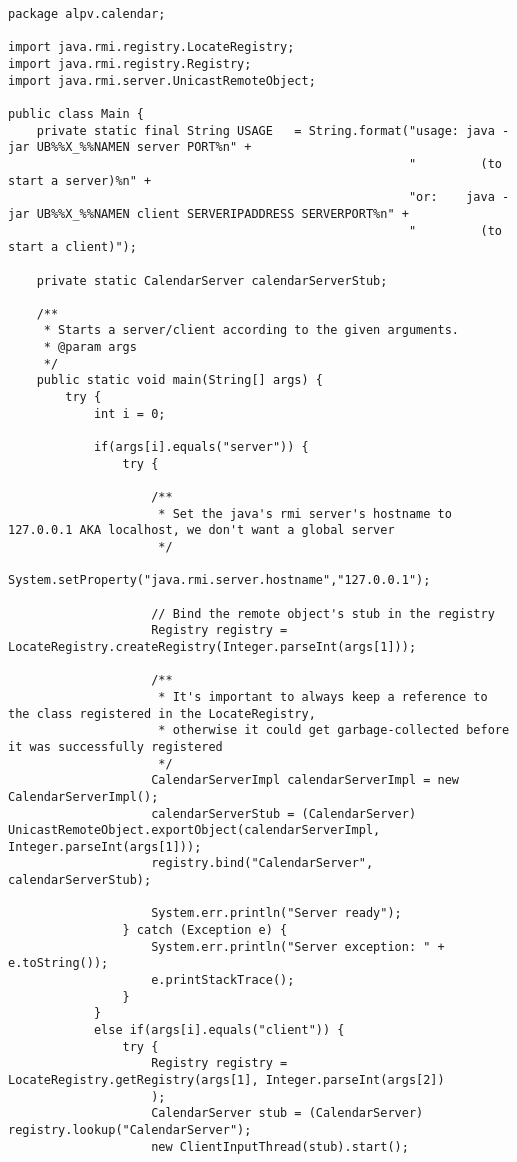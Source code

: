 \begin{lstlisting}[style=java]
package alpv.calendar;

import java.rmi.registry.LocateRegistry;
import java.rmi.registry.Registry;
import java.rmi.server.UnicastRemoteObject;

public class Main {
    private static final String USAGE   = String.format("usage: java -jar UB%%X_%%NAMEN server PORT%n" +
                                                        "         (to start a server)%n" +
                                                        "or:    java -jar UB%%X_%%NAMEN client SERVERIPADDRESS SERVERPORT%n" +
                                                        "         (to start a client)");

    private static CalendarServer calendarServerStub;

    /**
     * Starts a server/client according to the given arguments. 
     * @param args
     */
    public static void main(String[] args) {
        try {
            int i = 0;

            if(args[i].equals("server")) {
                try {

                    /**
                     * Set the java's rmi server's hostname to 127.0.0.1 AKA localhost, we don't want a global server
                     */
                    System.setProperty("java.rmi.server.hostname","127.0.0.1");

                    // Bind the remote object's stub in the registry
                    Registry registry = LocateRegistry.createRegistry(Integer.parseInt(args[1]));

                    /**
                     * It's important to always keep a reference to the class registered in the LocateRegistry,
                     * otherwise it could get garbage-collected before it was successfully registered
                     */
                    CalendarServerImpl calendarServerImpl = new CalendarServerImpl();
                    calendarServerStub = (CalendarServer) UnicastRemoteObject.exportObject(calendarServerImpl, Integer.parseInt(args[1]));
                    registry.bind("CalendarServer", calendarServerStub);

                    System.err.println("Server ready");
                } catch (Exception e) {
                    System.err.println("Server exception: " + e.toString());
                    e.printStackTrace();
                }
            }
            else if(args[i].equals("client")) {
                try {
                    Registry registry = LocateRegistry.getRegistry(args[1], Integer.parseInt(args[2])
                    );
                    CalendarServer stub = (CalendarServer) registry.lookup("CalendarServer");
                    new ClientInputThread(stub).start();


\end{lstlisting}
